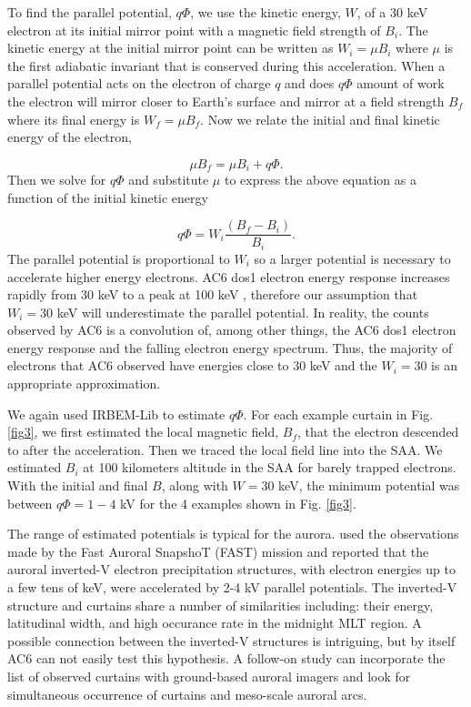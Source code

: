 \documentclass[draft]{agujournal2019}
\begin{document}
To find the parallel potential, $q \Phi$,  we use the kinetic energy, $W$, of a $30$ keV electron at its initial mirror point with a magnetic field strength of $B_i$. The kinetic energy at the initial mirror point can be written as $W_i = \mu B_i$ where $\mu$ is the first adiabatic invariant that is conserved during this acceleration. When a parallel potential acts on the electron of charge $q$ and does $q \Phi$ amount of work the electron will mirror closer to Earth's surface and mirror at a field strength $B_f$ where its final energy is $W_f = \mu B_f$. Now we relate the initial and final kinetic energy of the electron,

\begin{equation}
\mu B_f = \mu B_i + q \Phi.
\end{equation} Then we solve for $q \Phi$ and substitute $\mu$ to express the above equation as a function of the initial kinetic energy 

\begin{equation}
 q \Phi = W_i \frac{(B_f - B_i)}{B_i}.
\end{equation} The parallel potential is proportional to $W_i$ so a larger potential is necessary to accelerate higher energy electrons. AC6 dos1 electron energy response increases rapidly from 30 keV to a peak at 100 keV \cite<Figure 2 in>{O'brien2019}, therefore our assumption that $W_i = 30$ keV will underestimate the parallel potential. In reality, the counts observed by AC6 is a convolution of, among other things, the AC6 dos1 electron energy response and the falling electron energy spectrum. Thus, the majority of electrons that AC6 observed have energies close to 30 keV and the $W_i = 30$ is an appropriate approximation.

We again used IRBEM-Lib to estimate $ q \Phi$. For each example curtain in Fig. \ref{fig3}, we first estimated the local magnetic field, $B_f$, that the electron descended to after the acceleration. Then we traced the local field line into the SAA. We estimated $B_i$ at 100 kilometers altitude in the SAA for barely trapped electrons. With the initial and final $B$, along with $W = 30$ keV, the minimum potential was between $q \Phi = 1-4$ kV for the 4 examples shown in Fig. \ref{fig3}. 

The range of estimated potentials is typical for the aurora.  used the observations made by the Fast Auroral SnapshoT (FAST) mission and reported that the auroral inverted-V electron precipitation structures, with electron energies up to a few tens of keV, were accelerated by 2-4 kV parallel potentials. The inverted-V structure and curtains share a number of similarities including: their energy, latitudinal width, and high occurance rate in the midnight MLT region. A possible connection between the inverted-V structures is intriguing, but by itself AC6 can not easily test this hypothesis. A follow-on study can incorporate the list of observed curtains with ground-based auroral imagers and look for simultaneous occurrence of curtains and meso-scale auroral arcs.
\end{document}
